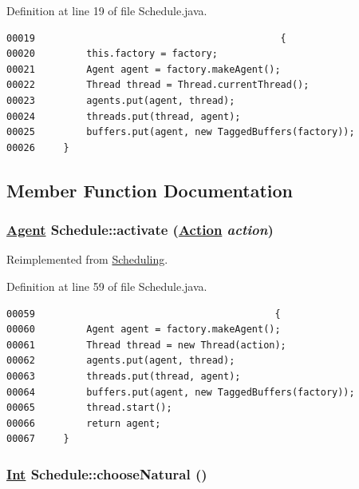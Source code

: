 Definition at line 19 of file Schedule.java.\footnotesize\begin{verbatim}00019                                           {
00020         this.factory = factory;
00021         Agent agent = factory.makeAgent();
00022         Thread thread = Thread.currentThread();
00023         agents.put(agent, thread);
00024         threads.put(thread, agent);
00025         buffers.put(agent, new TaggedBuffers(factory));
00026     }
\end{verbatim}\normalsize 


\subsection{Member Function Documentation}
\hypertarget{classSchedule_a2}{
\subsubsection[activate]{\setlength{\rightskip}{0pt plus 5cm}\hyperlink{interfaceAgent}{Agent} Schedule::activate (\hyperlink{interfaceAction}{Action} {\em action})}}
\label{classSchedule_a2}




Reimplemented from \hyperlink{interfaceScheduling_a2}{Scheduling}.

Definition at line 59 of file Schedule.java.\footnotesize\begin{verbatim}00059                                          {
00060         Agent agent = factory.makeAgent();
00061         Thread thread = new Thread(action);
00062         agents.put(agent, thread);
00063         threads.put(thread, agent);
00064         buffers.put(agent, new TaggedBuffers(factory));
00065         thread.start();
00066         return agent;
00067     }
\end{verbatim}\normalsize 
\hypertarget{classSchedule_a6}{
\subsubsection[chooseNatural]{\setlength{\rightskip}{0pt plus 5cm}\hyperlink{interfaceInt}{Int} Schedule::choose\-Natural ()}}
\label{classSchedule_a6}




